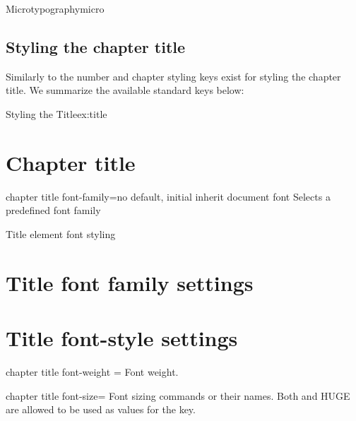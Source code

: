 \begin{decription}
\begin{texexample}{Microtypography}{micro}
\egroup
\end{texexample}


\hbox{}

\hbox{}


\section{Styling the chapter title}

Similarly to the number and chapter styling keys exist for styling the chapter title. We summarize the available standard keys below:

\begin{texexample}{Styling the Title}{ex:title} 
\chapter{Chapter title}
\lorem
\end{texexample}


\begin{docKey}[phd]{chapter title font-family}{=}{no default, initial inherit document font}
Selects a predefined font family
\end{docKey}

\begin{texexample}{Title element font styling}{}
\chapter{Title font family settings}
\lorem
{}
\chapter{Title font-style settings}
\lorem
\end{texexample}


\begin{docKey}[phd]{chapter title font-weight}{ = } {}
Font weight.
\end{docKey}

\begin{docKey}[phd]{chapter title font-size}{= }{}
Font sizing commands or their names. Both \docAuxCommand{\HUGE} and HUGE are allowed to be used as values for the key.
\end{docKey}


\end{decription}
